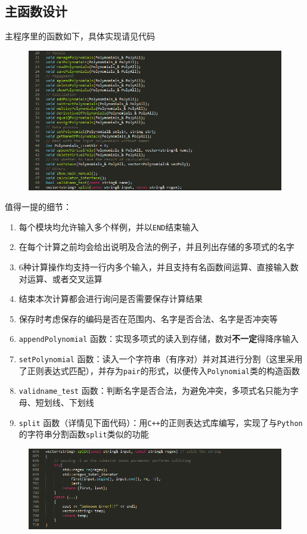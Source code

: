\documentclass[11pt,UTF8]{ctexart}
\begin{document}
\subsection{主函数设计}
\par 主程序里的函数如下，具体实现请见代码
\begin{figure}[H]
\centering
\includegraphics[width=\linewidth]{pic/main1.PNG}
\label{Fig:main1}
\end{figure}
\par 值得一提的细节：
\begin{enumerate}
	\item 每个模块均允许输入多个样例，并以\verb'END'结束输入
	\item 在每个计算之前均会给出说明及合法的例子，并且列出存储的多项式的名字
	\item $6$种计算操作均支持一行内多个输入，并且支持有名函数间运算、直接输入数对运算、或者交叉运算
	\item 结束本次计算都会进行询问是否需要保存计算结果
	\item 保存时考虑保存的编码是否在范围内、名字是否合法、名字是否冲突等
	\item \verb'appendPolynomial' 函数：实现多项式的读入到存储，数对\textbf{不一定}得降序输入
	\item \verb'setPolynomial' 函数：读入一个字符串（有序对）并对其进行分割（这里采用了正则表达式匹配），并存为\verb'pair'的形式，以便传入\verb'Polynomial'类的构造函数
	\item \verb'validname_test' 函数：判断名字是否合法，为避免冲突，多项式名只能为字母、短划线、下划线
	\item \verb'split' 函数（详情见下面代码）：用\verb'C++'的正则表达式库编写，实现了与\verb'Python'的字符串分割函数\verb'split'类似的功能
\end{enumerate}
\begin{figure}[H]
\centering
\includegraphics[width=\linewidth]{pic/split.PNG}
\label{Fig:split}
\end{figure}
\end{document}
